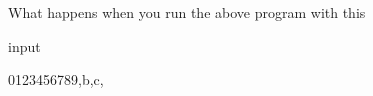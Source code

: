 What happens when you run the above program with this

input



\begin{console}

0123456789,b,c,

\end{console}

